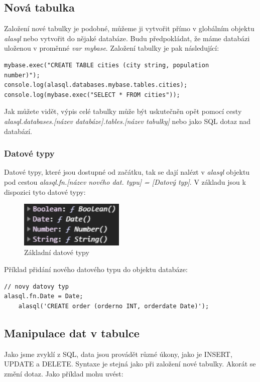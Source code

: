 \documentclass[a4, titlepage]{article}
\begin{document}
\subsection{Nová tabulka}
Založení nové tabulky je podobné, můžeme ji vytvořit přímo v globálním objektu \textit{alasql} nebo vytvořit do nějaké databáze. Budu předpokládat, že máme databázi uloženou v proměnné \textit{var mybase}. Založení tabulky je pak následující:

\begin{lstlisting}
mybase.exec("CREATE TABLE cities (city string, population 
number)");
console.log(alasql.databases.mybase.tables.cities);
console.log(mybase.exec("SELECT * FROM cities"));
\end{lstlisting}

Jak můžete vidět, výpis celé tabulky může být uskutečněn opět pomocí cesty \textit{alasql.databases.[název databáze].tables.[název tabulky]} nebo jako SQL dotaz nad databází.

\subsubsection{Datové typy}
Datové typy, které jsou dostupné od začátku, tak se dají nalézt v \textit{alasql} objektu pod cestou \textit{alasql.fn.[název nového dat. typu] = [Datový typ]}. V základu jsou k dispozici tyto datové typy:
\begin{figure}[h]
    \centering
    \includegraphics[width=5cm]{fn}
    \caption{Základní datové typy}
\end{figure}

Příklad přidání nového datového typu do objektu databáze:
\begin{lstlisting}
// novy datovy typ
alasql.fn.Date = Date;
    alasql('CREATE order (orderno INT, orderdate Date)');
\end{lstlisting}

\subsection{Manipulace dat v tabulce}
Jako jsme zvyklí z SQL, data jsou provádět různé úkony, jako je INSERT, UPDATE a DELETE. Syntaxe je stejná jako při založení nové tabulky. Akorát se změní dotaz. Jako příklad mohu uvést:
\end{document}
